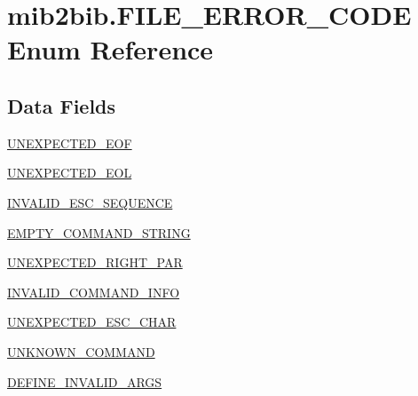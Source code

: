\hypertarget{enummib2bib_1_1mib2bib_1_1_f_i_l_e___e_r_r_o_r___c_o_d_e}{}\section{mib2bib.\+F\+I\+L\+E\+\_\+\+E\+R\+R\+O\+R\+\_\+\+C\+O\+D\+E Enum Reference}
\label{enummib2bib_1_1mib2bib_1_1_f_i_l_e___e_r_r_o_r___c_o_d_e}
\subsection*{Data Fields}
\begin{DoxyCompactItemize}
\item 
\hyperlink{enummib2bib_1_1mib2bib_1_1_f_i_l_e___e_r_r_o_r___c_o_d_e_a7d3144b5c66d6828a83186b203672e4a}{U\+N\+E\+X\+P\+E\+C\+T\+E\+D\+\_\+\+E\+O\+F}
\item 
\hyperlink{enummib2bib_1_1mib2bib_1_1_f_i_l_e___e_r_r_o_r___c_o_d_e_ac3634553d76b0bb148f7cf15ace7d0ec}{U\+N\+E\+X\+P\+E\+C\+T\+E\+D\+\_\+\+E\+O\+L}
\item 
\hyperlink{enummib2bib_1_1mib2bib_1_1_f_i_l_e___e_r_r_o_r___c_o_d_e_a403331d3b57a52eb3a15d3b2bab87916}{I\+N\+V\+A\+L\+I\+D\+\_\+\+E\+S\+C\+\_\+\+S\+E\+Q\+U\+E\+N\+C\+E}
\item 
\hyperlink{enummib2bib_1_1mib2bib_1_1_f_i_l_e___e_r_r_o_r___c_o_d_e_ac26a2c23e0b4184f36479872018c74c9}{E\+M\+P\+T\+Y\+\_\+\+C\+O\+M\+M\+A\+N\+D\+\_\+\+S\+T\+R\+I\+N\+G}
\item 
\hyperlink{enummib2bib_1_1mib2bib_1_1_f_i_l_e___e_r_r_o_r___c_o_d_e_a1b9d6407382ec108ef77f5c52c42cb50}{U\+N\+E\+X\+P\+E\+C\+T\+E\+D\+\_\+\+R\+I\+G\+H\+T\+\_\+\+P\+A\+R}
\item 
\hyperlink{enummib2bib_1_1mib2bib_1_1_f_i_l_e___e_r_r_o_r___c_o_d_e_abea9b595c99e6c0e0ad3ad1eabd5d059}{I\+N\+V\+A\+L\+I\+D\+\_\+\+C\+O\+M\+M\+A\+N\+D\+\_\+\+I\+N\+F\+O}
\item 
\hyperlink{enummib2bib_1_1mib2bib_1_1_f_i_l_e___e_r_r_o_r___c_o_d_e_a4682e11edf92ee25f751a82db481acc5}{U\+N\+E\+X\+P\+E\+C\+T\+E\+D\+\_\+\+E\+S\+C\+\_\+\+C\+H\+A\+R}
\item 
\hyperlink{enummib2bib_1_1mib2bib_1_1_f_i_l_e___e_r_r_o_r___c_o_d_e_a2f6faafa90b1a1074e5bd9cac0472eee}{U\+N\+K\+N\+O\+W\+N\+\_\+\+C\+O\+M\+M\+A\+N\+D}
\item 
\hyperlink{enummib2bib_1_1mib2bib_1_1_f_i_l_e___e_r_r_o_r___c_o_d_e_a5ec83d08a5d99ac4cb8a0a2429a57afc}{D\+E\+F\+I\+N\+E\+\_\+\+I\+N\+V\+A\+L\+I\+D\+\_\+\+A\+R\+G\+S}

\end{DoxyCompactItemize}
